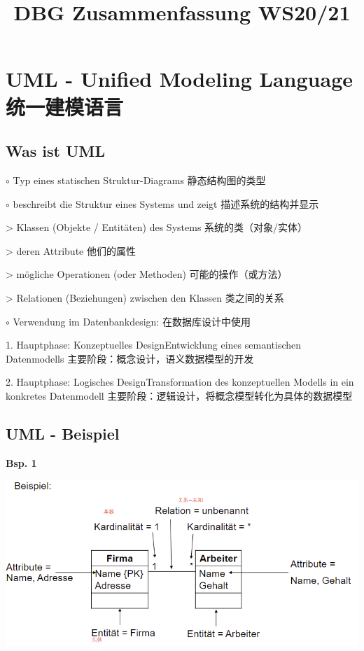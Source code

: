 \documentclass[fleqn]{article}
\title{DBG Zusammenfassung WS20/21}
\begin{document}
\maketitle

\tableofcontents

\pagestyle{main}

\newpage

\section{UML - Unified Modeling Language 统一建模语言}

\subsection{Was ist UML}

\noindent $\circ$ Typ eines statischen Struktur-Diagrams 静态结构图的类型

\noindent $\circ$ beschreibt die Struktur eines Systems und zeigt 描述系统的结构并显示

> Klassen (Objekte / Entitäten) des Systems 系统的类（对象/实体）

> deren Attribute 他们的属性

> mögliche Operationen (oder Methoden) 可能的操作（或方法）

> Relationen (Beziehungen) zwischen den Klassen 类之间的关系

\noindent $\circ$ Verwendung im Datenbankdesign: 在数据库设计中使用

1. Hauptphase: Konzeptuelles DesignEntwicklung eines semantischen Datenmodells 主要阶段：概念设计，语义数据模型的开发

2. Hauptphase: Logisches DesignTransformation des konzeptuellen Modells in ein konkretes Datenmodell 主要阶段：逻辑设计，将概念模型转化为具体的数据模型

\subsection{UML - Beispiel}

\noindent\textbf{Bsp. 1}

\begin{center}
    \includegraphics[scale=0.5]{1.png}
\end{center}  
\end{document}

